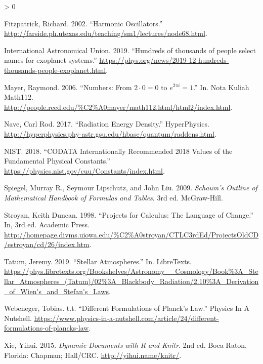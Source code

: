 \documentclass[
]{book}
\newlength{\cslhangindent}
\newenvironment{CSLReferences}[2] %
 {%
  \setlength{\parindent}{0pt}
  \ifodd #1 \everypar{\setlength{\hangindent}{\cslhangindent}}\ignorespaces\fi
  \ifnum #2 > 0
  \setlength{\parskip}{#2\baselineskip}
  \fi
 }%
 {}
\begin{document}
\hypertarget{refs}{}
\begin{CSLReferences}{1}{0}
\leavevmode\hypertarget{ref-FitzOsc}{}%
Fitzpatrick, Richard. 2002. {``{Harmonic Oscillators}.''}
\url{http://farside.ph.utexas.edu/teaching/sm1/lectures/node68.html}.

\leavevmode\hypertarget{ref-iau2019}{}%
International Astronomical Union. 2019. {``{Hundreds of thousands of
people select names for exoplanet systems}.''}
\url{https://phys.org/news/2019-12-hundreds-thousands-people-exoplanet.html}.

\leavevmode\hypertarget{ref-Mayer2006}{}%
Mayer, Raymond. 2006. {``{Numbers: From \(2\cdot0=0\) to
\(e^{2\pi i}=1\)}.''} In. {Nota Kuliah Math112}.
\url{http://people.reed.edu/\%C2\%A0mayer/math112.html/html2/index.html}.

\leavevmode\hypertarget{ref-Nave2017}{}%
Nave, Carl Rod. 2017. {``{Radiation Energy Density}.''} HyperPhysics.
\url{http://hyperphysics.phy-astr.gsu.edu/hbase/quantum/raddens.html}.

\leavevmode\hypertarget{ref-CODATA2018}{}%
NIST. 2018. {``{CODATA Internationally Recommended 2018 Values of the
Fundamental Physical Constants}.''}
\url{https://physics.nist.gov/cuu/Constants/index.html}.

\leavevmode\hypertarget{ref-spiegel2009}{}%
Spiegel, Murray R., Seymour Lipschutz, and John Liu. 2009.
\emph{{Schaum's Outline of Mathematical Handbook of Formulas and
Tables}}. 3rd ed. McGraw-Hill.

\leavevmode\hypertarget{ref-Stroyan1998}{}%
Stroyan, Keith Duncan. 1998. {``{Projects for Calculus: The Language of
Change}.''} In, 3rd ed. Academic Press.
\url{http://homepage.divms.uiowa.edu/\%C2\%A0stroyan/CTLC3rdEd/ProjectsOldCD/estroyan/cd/26/index.htm}.

\leavevmode\hypertarget{ref-Tatum2019}{}%
Tatum, Jeremy. 2019. {``{Stellar Atmospheres}.''} In. LibreTexts.
\url{https://phys.libretexts.org/Bookshelves/Astronomy__Cosmology/Book\%3A_Stellar_Atmospheres_(Tatum)/02\%3A_Blackbody_Radiation/2.10\%3A_Derivation_of_Wien's_and_Stefan's_Laws}.

\leavevmode\hypertarget{ref-Webeneger_tt}{}%
Webeneger, Tobias. t.t. {``{Different Formulations of Planck's Law}.''}
Physics In A Nutshell.
\url{https://www.physics-in-a-nutshell.com/article/24/different-formulations-of-plancks-law}.

\leavevmode\hypertarget{ref-xie2015}{}%
Xie, Yihui. 2015. \emph{Dynamic Documents with {R} and Knitr}. 2nd ed.
Boca Raton, Florida: Chapman; Hall/CRC. \url{http://yihui.name/knitr/}.

\end{CSLReferences}

\backmatter
\end{document}
